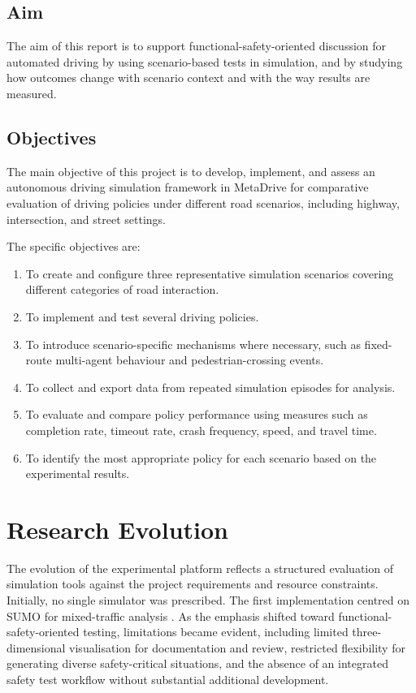 \documentclass[12pt,a4paper]{report}
\begin{document}
\subsection*{Aim}
The aim of this report is to support functional-safety-oriented discussion for automated driving by using scenario-based tests in simulation, and by studying how outcomes change with scenario context and with the way results are measured.

\subsection*{Objectives}
The main objective of this project is to develop, implement, and assess an autonomous driving simulation framework in MetaDrive for comparative evaluation of driving policies under different road scenarios, including highway, intersection, and street settings.

\vspace{0.5em}
The specific objectives are:
\begin{enumerate}[label=\arabic*.]
    \item To create and configure three representative simulation scenarios covering different categories of road interaction.
    \item To implement and test several driving policies.
    \item To introduce scenario-specific mechanisms where necessary, such as fixed-route multi-agent behaviour and pedestrian-crossing events.
    \item To collect and export data from repeated simulation episodes for analysis.
    \item To evaluate and compare policy performance using measures such as completion rate, timeout rate, crash frequency, speed, and travel time.
    \item To identify the most appropriate policy for each scenario based on the experimental results.
\end{enumerate}

\section{Research Evolution}
The evolution of the experimental platform reflects a structured evaluation of simulation tools against the project requirements and resource constraints. Initially, no single simulator was prescribed. The first implementation centred on SUMO for mixed-traffic analysis \cite{sumo,treiber2000congested,sumo_docs}. As the emphasis shifted toward functional-safety-oriented testing, limitations became evident, including limited three-dimensional visualisation for documentation and review, restricted flexibility for generating diverse safety-critical situations, and the absence of an integrated safety test workflow without substantial additional development.
\end{document}

